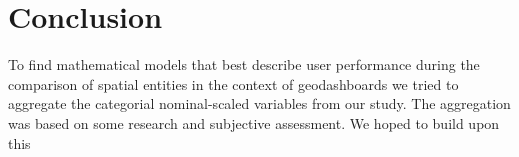 \chapter{Conclusion}

To find mathematical models that best describe user performance during the comparison of spatial entities in the context of geodashboards
we tried to aggregate the categorial nominal-scaled variables from our study. The aggregation was based on some research and subjective assessment.
We hoped to build upon this 